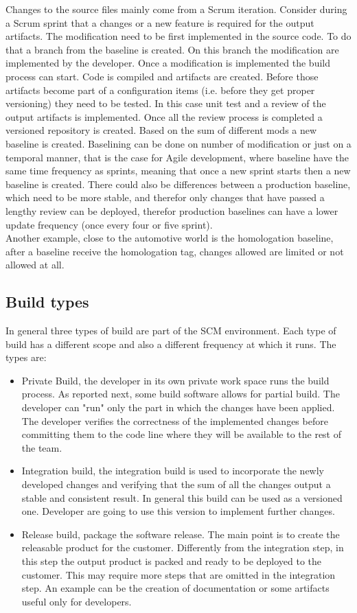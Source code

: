 \documentclass[../main.tex]{subfiles}
\begin{document}
Changes to the source files mainly come from a Scrum iteration. Consider during a Scrum sprint that a changes or a new feature is required for the output artifacts. The modification need to be first implemented in the source code. To do that a branch from the baseline is created. On this branch the modification are implemented by the developer. Once a modification is implemented the build process can start. Code is compiled and artifacts are created. Before those artifacts become part of a configuration items (i.e. before they get proper versioning) they need to be tested. In this case unit test and a review of the output artifacts is implemented. Once all the review process is completed a versioned repository is created. Based on the sum of different mods a new baseline is created. Baselining can be done on number of modification or just on a temporal manner, that is the case for Agile development, where baseline have the same time frequency as sprints, meaning that once a new sprint starts then a new baseline is created. There could also be differences between a production baseline, which need to be more stable, and therefor only changes that have passed a lengthy review can be deployed, therefor production baselines can have a lower update frequency (once every four or five sprint).\\
Another example, close to the automotive world is the homologation baseline, after a baseline receive the homologation tag, changes allowed are limited or not allowed at all. 
\subsection{Build types}
In general three types of build are part of the \gls{SCM} environment. Each type of build has a different scope and also a different frequency at which it runs. The types are:
\begin{itemize}
    \item Private Build, the developer in its own private work space runs the build process. As reported next, some build software allows for partial build. The developer can "run" only the part in which the changes have been applied. The developer verifies the correctness of the implemented changes before committing them to the code line where they will be available to the rest of the team. 
    \item Integration build, the integration build is used to incorporate the newly developed changes and verifying that the sum of all the changes output a stable and consistent result. In general this build can be used as a versioned one. Developer are going to use this version to implement further changes. 
    \item Release build, package the software release. The main point is to create the releasable product for the customer. Differently from the integration step, in this step the output product is packed and ready to be deployed to the customer. This may require more steps that are omitted in the integration step. An example can be the creation of documentation or some artifacts useful only for developers. 
\end{itemize}
\end{document}
